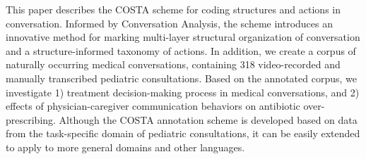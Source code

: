 This paper describes the COSTA scheme for coding structures and actions in conversation. Informed by Conversation Analysis, the scheme introduces an innovative method for marking multi-layer structural organization of conversation and a structure-informed taxonomy of actions. In addition, we create a corpus of naturally occurring medical conversations, containing 318 video-recorded and manually transcribed pediatric consultations. Based on the annotated corpus, we investigate 1) treatment decision-making process in medical conversations, and 2) effects of physician-caregiver communication behaviors on antibiotic over-prescribing. Although the COSTA annotation scheme is developed based on data from the task-specific domain of pediatric consultations, it can be easily extended to apply to more general domains and other languages.
